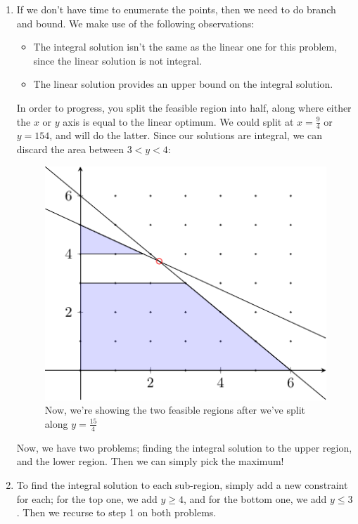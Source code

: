 \begin{enumerate}
  \item If we don't have time to enumerate the points, then we need to do 
  branch and bound. We make use of the following observations:
  
  \begin{itemize}
    \item The integral solution isn't the same as the linear one for this
      problem, since the linear solution is not integral.
    \item The linear solution provides an upper bound on the integral solution.
  \end{itemize}

  In order to progress, you split the feasible region into half, along where
  either the $x$ or $y$ axis is equal to the linear optimum. We could split at
  $x = \frac{9}{4}$ or $y = {15}{4}$, and will do the latter. Since our
  solutions are integral, we can discard the area between $3 < y < 4$:

  \begin{figure}[H]
    \centering
    \includegraphics{diagrams/graph6}
    \caption{Now, we're showing the two feasible regions after we've split 
      along $y = \frac{15}{4}$}
    \label{fig:graph-6}
  \end{figure}

  Now, we have two problems; finding the integral solution to the upper region,
  and the lower region. Then we can simply pick the maximum!

\item To find the integral solution to each sub-region, simply add a new 
  constraint for each; for the top one, we add $y \geq 4$, and for the bottom 
  one, we add $y \leq 3$. Then we recurse to step 1 on both problems.


\end{enumerate}

